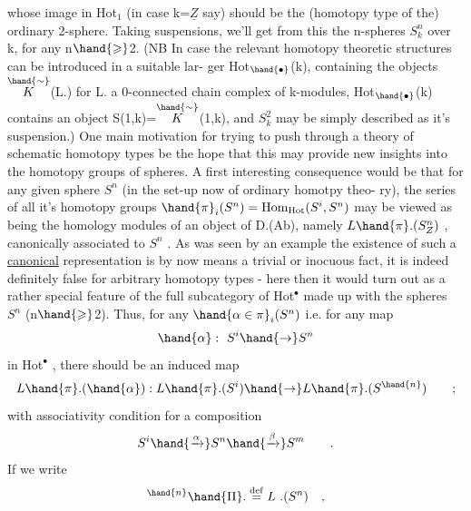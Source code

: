 
 whose image in Hot$_1$ (in case k=$\underline{Z}$ say) should be the (homotopy type
of the) ordinary 2-sphere. Taking suspensions, we'll get from this
the n-spheres $S^n_k$ over k, for any n$\hand{\geqslant}$2. (NB In case the relevant
homotopy theoretic structures can be introduced in  a suitable lar-%
ger Hot$_{\hand{\bullet}}$(k), containing the objects $\overset{\hand{\sim}}{K}$(L.) for L.  a 0-connected
chain complex of k-modules, Hot$_{\hand{\bullet}}$(k) contains an object S(1,k)=$\overset{\hand{\sim}}{K}$(1,k),
and $S^2_k$ may be simply described as it's suspension.) One main motivation
for trying to push through a theory of schematic homotopy types  be
 the hope that this may provide new insights into the homotopy
groups of spheres. A first interesting consequence would be
that for any given sphere $S^n$ (in the set-up now of ordinary homotpy theo-%
ry), the series of all it's homotopy groups $\hand{\pi}_i(S^n) = \mathrm{Hom}_{\mathrm{Hot}}(S^i,S^n)$
may be viewed as being the homology modules of an object of D.(Ab),
namely $L\hand{\pi}.(S^n_{Z})$ , canonically associated to $S^n$ . As was seen by an
example\deleted{,} the existence of such a \uline{canonical} representation is by now
means a trivial or inocuous fact, it is indeed  definitely
false for arbitrary homotopy types - here then it would turn out as a
rather special feature of the full subcategory of Hot$^\bullet$ made up with
the spheres $S^n$ (n$\hand{\geqslant}$2). Thus, for any $\hand{\alpha\in\pi}_i(S^n)$ i.e. for any map
\[\hand{\alpha} :\ S^i \hand{\to} S^n\]
in Hot$^\bullet$ , there should be an induced map
\[L\hand{\pi}.(\hand{\alpha}) : L\hand{\pi}.(S^i) \hand{\to} L\hand{\pi}.(S^{\hand{n}}) \qquad ;\]
with associativity condition for a composition
\[S^i \hand{\xrightarrow{\alpha}} S^n \hand{\xrightarrow{\beta}} S^m \qquad .\]
If we write
\[{}^{\hand{n}}\hand{\Pi}. \overset{\mathrm{def}}{=} L\ .(S^n) \quad ,\]
